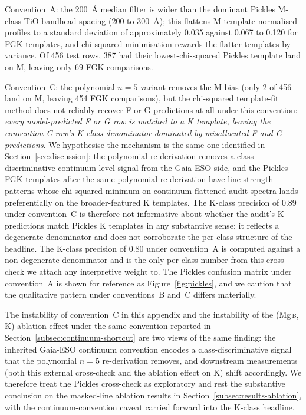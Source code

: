 \documentclass[11pt,a4paper]{article}
\newcommand{\Mgb}{Mg\,\textsc{b}\xspace}
\begin{document}
Convention~A: the 200~\AA{} median filter is wider than the dominant Pickles M-class TiO bandhead spacing (200 to 300~\AA{}); this flattens M-template normalised profiles to a standard deviation of approximately 0.035 against 0.067 to 0.120 for FGK templates, and chi-squared minimisation rewards the flatter templates by variance. Of 456 test rows, 387 had their lowest-chi-squared Pickles template land on M, leaving only 69 FGK comparisons.

Convention~C: the polynomial $n=5$ variant removes the M-bias (only 2 of 456 land on M, leaving 454 FGK comparisons), but the chi-squared template-fit method does not reliably recover F or G predictions at all under this convention: \emph{every model-predicted F or G row is matched to a K template, leaving the convention-C row's K-class denominator dominated by misallocated F and G predictions}. We hypothesise the mechanism is the same one identified in Section~\ref{sec:discussion}: the polynomial re-derivation removes a class-discriminative continuum-level signal from the Gaia-ESO side, and the Pickles FGK templates after the same polynomial re-derivation have line-strength patterns whose chi-squared minimum on continuum-flattened audit spectra lands preferentially on the broader-featured K templates. The K-class precision of 0.89 under convention~C is therefore not informative about whether the audit's K predictions match Pickles K templates in any substantive sense; it reflects a degenerate denominator and does not corroborate the per-class structure of the headline. The K-class precision of 0.80 under convention~A is computed against a non-degenerate denominator and is the only per-class number from this cross-check we attach any interpretive weight to. The Pickles confusion matrix under convention~A is shown for reference as Figure~\ref{fig:pickles}, and we caution that the qualitative pattern under conventions~B and~C differs materially.

The instability of convention~C in this appendix and the instability of the (\Mgb, K) ablation effect under the same convention reported in Section~\ref{subsec:continuum-shortcut} are two views of the same finding: the inherited Gaia-ESO continuum convention encodes a class-discriminative signal that the polynomial $n=5$ re-derivation removes, and downstream measurements (both this external cross-check and the ablation effect on K) shift accordingly. We therefore treat the Pickles cross-check as exploratory and rest the substantive conclusion on the masked-line ablation results in Section~\ref{subsec:results-ablation}, with the continuum-convention caveat carried forward into the K-class headline.
\end{document}
